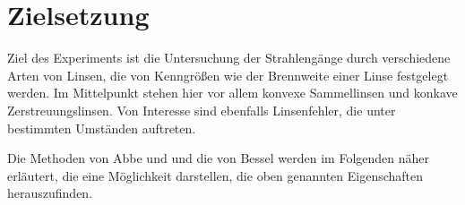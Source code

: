 \section{Zielsetzung}
\label{sec:Zielsetzung}

Ziel des Experiments ist die Untersuchung der Strahlengänge durch verschiedene Arten von Linsen, die von Kenngrößen 
wie der Brennweite einer Linse festgelegt werden. 
Im Mittelpunkt stehen hier vor allem konvexe Sammellinsen und konkave Zerstreuungslinsen. 
Von Interesse sind ebenfalls Linsenfehler, die unter bestimmten Umständen auftreten. 

Die Methoden von Abbe und und die von Bessel werden im Folgenden näher erläutert, die eine Möglichkeit darstellen, 
die oben genannten Eigenschaften herauszufinden. 
